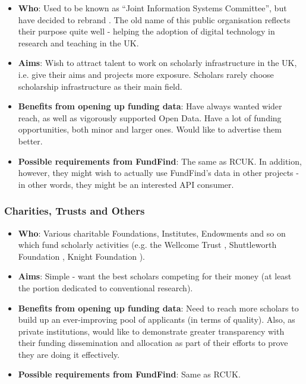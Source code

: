 \begin{itemize}
 \item \textbf{Who}: Used to be known as ``Joint Information Systems Committee'', but have decided to rebrand \cite{jisc-rebrand}. The old name of this public organisation reflects their purpose quite well - helping the adoption of digital technology in research and teaching in the UK.
 \item \textbf{Aims}: Wish to attract talent to work on scholarly infrastructure in the UK, i.e. give their aims and projects more exposure. Scholars rarely choose scholarship infrastructure as their main field.
 \item \textbf{Benefits from opening up funding data}: Have always wanted wider reach, as well as vigorously supported Open Data. Have a lot of funding opportunities, both minor and larger ones. Would like to advertise them better.
 \item \textbf{Possible requirements from FundFind}:  The same as RCUK. In addition, however, they might wish to actually use FundFind's data in other projects - in other words, they might be an interested API consumer.
\end{itemize}

\subsubsection{Charities, Trusts and Others}

\begin{itemize}
 \item \textbf{Who}: Various charitable Foundations, Institutes, Endowments and so on which fund scholarly activities (e.g. the Wellcome Trust \cite{wellcome-trust}, Shuttleworth Foundation \cite{shuttleworth-foundation}, Knight Foundation \cite{knight-foundation}).
 \item \textbf{Aims}: Simple - want the best scholars competing for their money (at least the portion dedicated to conventional research).
 \item \textbf{Benefits from opening up funding data}: Need to reach more scholars to build up an ever-improving pool of applicants (in terms of quality). Also, as private institutions, would like to demonstrate greater transparency with their funding dissemination and allocation as part of their efforts to prove they are doing it effectively.
 \item \textbf{Possible requirements from FundFind}: Same as RCUK.
\end{itemize}

